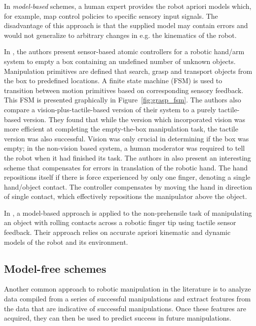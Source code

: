 In \emph{model-based} schemes, a human expert provides the robot apriori models which, for example, map control policies to specific sensory input signals.
The disadvantage of this approach is that the supplied model may contain errors and would not generalize to arbitrary changes in e.g. the kinematics of the robot.

In \cite{felip2011emptying}, the authors present sensor-based atomic controllers for a robotic hand/arm system to empty a box containing an undefined number of unknown objects.
Manipulation primitives are defined that search, grasp and transport objects from the box to predefined locations.
A finite state machine (FSM) is used to transition between motion primitives based on corresponding sensory feedback.
This FSM is presented graphically in Figure~\ref{fig:grasp_fsm}.
The authors also compare a vision-plus-tactile-based version of their system to a purely tactile-based version.
They found that while the version which incorporated vision was more efficient at completing the empty-the-box manipulation task, the tactile version was also successful.
Vision was only crucial in determining if the box was empty; in the non-vision based system, a human moderator was required to tell the robot when it had finished its task.
The authors in \cite{felip2011emptying} also present an interesting scheme that compensates for errors in translation of the robotic hand.
The hand repositions itself if there is force experienced by only one finger, denoting a single hand/object contact.
The controller compensates by moving the hand in direction of single contact, which effectively repositions the manipulator above the object.

In \cite{Zhang2012}, a model-based approach is applied to the non-prehensile task of manipulating an object with rolling contacts across a robotic finger tip using tactile sensor feedback.
Their approach relies on accurate apriori kinematic and dynamic models of the robot and its environment.


\subsection{Model-free schemes}

Another common approach to robotic manipulation in the literature is to analyze data compiled from a series of successful manipulations and extract features from the data that are indicative of successful manipulations.
Once these features are acquired, they can then be used to predict success in future manipulations.

